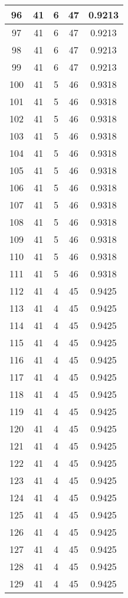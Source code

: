 \documentclass[letterpaper, 12pt]{article}
\begin{document}
\begin{longtable}{|c|c|c|c|c|}
\hline
96 & 41 & 6 & 47 & 0.9213 \\
\hline
97 & 41 & 6 & 47 & 0.9213 \\
\hline
98 & 41 & 6 & 47 & 0.9213 \\
\hline
99 & 41 & 6 & 47 & 0.9213 \\
\hline
100 & 41 & 5 & 46 & 0.9318 \\
\hline
101 & 41 & 5 & 46 & 0.9318 \\
\hline
102 & 41 & 5 & 46 & 0.9318 \\
\hline
103 & 41 & 5 & 46 & 0.9318 \\
\hline
104 & 41 & 5 & 46 & 0.9318 \\
\hline
105 & 41 & 5 & 46 & 0.9318 \\
\hline
106 & 41 & 5 & 46 & 0.9318 \\
\hline
107 & 41 & 5 & 46 & 0.9318 \\
\hline
108 & 41 & 5 & 46 & 0.9318 \\
\hline
109 & 41 & 5 & 46 & 0.9318 \\
\hline
110 & 41 & 5 & 46 & 0.9318 \\
\hline
111 & 41 & 5 & 46 & 0.9318 \\
\hline
112 & 41 & 4 & 45 & 0.9425 \\
\hline
113 & 41 & 4 & 45 & 0.9425 \\
\hline
114 & 41 & 4 & 45 & 0.9425 \\
\hline
115 & 41 & 4 & 45 & 0.9425 \\
\hline
116 & 41 & 4 & 45 & 0.9425 \\
\hline
117 & 41 & 4 & 45 & 0.9425 \\
\hline
118 & 41 & 4 & 45 & 0.9425 \\
\hline
119 & 41 & 4 & 45 & 0.9425 \\
\hline
120 & 41 & 4 & 45 & 0.9425 \\
\hline
121 & 41 & 4 & 45 & 0.9425 \\
\hline
122 & 41 & 4 & 45 & 0.9425 \\
\hline
123 & 41 & 4 & 45 & 0.9425 \\
\hline
124 & 41 & 4 & 45 & 0.9425 \\
\hline
125 & 41 & 4 & 45 & 0.9425 \\
\hline
126 & 41 & 4 & 45 & 0.9425 \\
\hline
127 & 41 & 4 & 45 & 0.9425 \\
\hline
128 & 41 & 4 & 45 & 0.9425 \\
\hline
129 & 41 & 4 & 45 & 0.9425 \\

\end{longtable}
\end{document}
